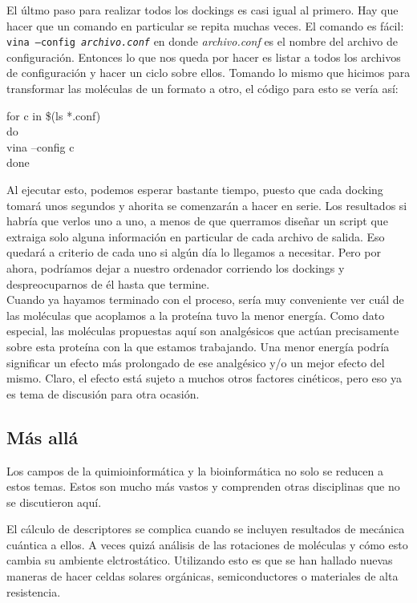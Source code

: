 \documentclass[10pt,letterpaper]{article}
\newcommand{\inlinecode}[1]{
\colorbox{light-gray}{\texttt{#1}}
}
\newenvironment{Code}
{
\begin{lrbox}{\selvestebox}%
\begin{minipage}{\dimexpr\columnwidth-2\fboxsep\relax}
\fontfamily{\ttdefault}\selectfont
}
{\end{minipage}\end{lrbox}%
\begin{center}
\colorbox{light-gray}{\usebox{\selvestebox}}
\end{center}
}
\begin{document}
El \'ultmo paso para realizar todos los dockings es casi igual al primero. Hay que hacer que un comando en particular se repita muchas veces. El comando es f\'acil: \inlinecode{vina --config \emph{archivo.conf}} en donde \emph{archivo.conf} es el nombre del archivo de configuraci\'on. Entonces lo que nos queda por hacer es listar a todos los archivos de configuraci\'on y hacer un ciclo sobre ellos. Tomando lo mismo que hicimos para transformar las mol\'eculas de un formato a otro, el c\'odigo para esto se ver\'ia as\'i:

\begin{Code}
for c in \$(ls *.conf)\\
do\\
vina --config c\\
done
\end{Code}

Al ejecutar esto, podemos esperar bastante tiempo, puesto que cada docking tomar\'a unos segundos y ahorita se comenzar\'an a hacer en serie. Los resultados si habr\'ia que verlos uno a uno, a menos de que querramos dise\~nar un script que extraiga solo alguna informaci\'on en particular de cada archivo de salida. Eso quedar\'a a criterio de cada uno si alg\'un d\'ia lo llegamos a necesitar. Pero por ahora, podr\'iamos dejar a nuestro ordenador corriendo los dockings y despreocuparnos de \'el hasta que termine.\\

Cuando ya hayamos terminado con el proceso, ser\'ia muy conveniente ver cu\'al de las mol\'eculas que acoplamos a la prote\'ina tuvo la menor energ\'ia. Como dato especial, las mol\'eculas propuestas aqu\'i son analg\'esicos que act\'uan precisamente sobre esta prote\'ina con la que estamos trabajando. Una menor energ\'ia podr\'ia significar un efecto m\'as prolongado de ese analg\'esico y/o un mejor efecto del mismo. Claro, el efecto est\'a sujeto a muchos otros factores cin\'eticos, pero eso ya es tema de discusi\'on para otra ocasi\'on.

\subsection{M\'as all\'a}
Los campos de la quimioinform\'atica y la bioinform\'atica no solo se reducen a estos temas. Estos son mucho m\'as vastos y comprenden otras disciplinas que no se discutieron aqu\'i.

El c\'alculo de descriptores se complica cuando se incluyen resultados de mec\'anica cu\'antica a ellos. A veces quiz\'a an\'alisis de las rotaciones de mol\'eculas y c\'omo esto cambia su ambiente elctrost\'atico. Utilizando esto es que se han hallado nuevas maneras de hacer celdas solares org\'anicas, semiconductores o materiales de alta resistencia.\\
\end{document}
